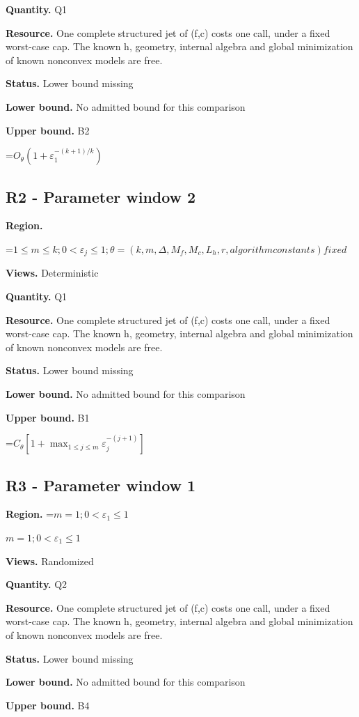 \documentclass[10pt,a4paper]{article}
\newcommand{\AtlasMath}[1]{\par\begingroup\centering\setbox0=\hbox{$\displaystyle #1$}\ifdim\wd0>1.4\linewidth\typeout{ATLAS WIDE FORMULA: \the\wd0}\fi\ifdim\wd0>\linewidth\resizebox{\linewidth}{!}{\box0}\else\box0\fi\par\endgroup}
\newcommand{\AtlasInlineMath}[1]{\begingroup\setbox0=\hbox{$#1$}\ifdim\wd0>.4\linewidth\endgroup\AtlasMath{#1}\else\endgroup$#1$\fi}
\begin{document}
\textbf{Quantity.} Q1

\textbf{Resource.} One complete structured jet of (f,c) costs one call, under a fixed worst-case cap. The known h, geometry, internal algebra and global minimization of known nonconvex models are free.

\textbf{Status.} Lower bound missing

\textbf{Lower bound.} No admitted bound for this comparison

\textbf{Upper bound.} B2

\AtlasMath{O_\theta(1+\varepsilon_1^{-(k+1)/k})}
\subsection{R2 - Parameter window 2}
\textbf{Region.} 
\AtlasMath{1\le m\le k;0<\varepsilon_j\le 1;\theta=(k,m,\Delta,M_f,M_c,L_h,r,algorithm constants) fixed}


\textbf{Views.} Deterministic

\textbf{Quantity.} Q1

\textbf{Resource.} One complete structured jet of (f,c) costs one call, under a fixed worst-case cap. The known h, geometry, internal algebra and global minimization of known nonconvex models are free.

\textbf{Status.} Lower bound missing

\textbf{Lower bound.} No admitted bound for this comparison

\textbf{Upper bound.} B1

\AtlasMath{C_\theta[1+\max_{1\le j\le m}\varepsilon_j^{-(j+1)}]}
\subsection{R3 - Parameter window 1}
\textbf{Region.} \AtlasInlineMath{m=1;0<\varepsilon_1\le 1}

\textbf{Views.} Randomized

\textbf{Quantity.} Q2

\textbf{Resource.} One complete structured jet of (f,c) costs one call, under a fixed worst-case cap. The known h, geometry, internal algebra and global minimization of known nonconvex models are free.

\textbf{Status.} Lower bound missing

\textbf{Lower bound.} No admitted bound for this comparison

\textbf{Upper bound.} B4
\end{document}
